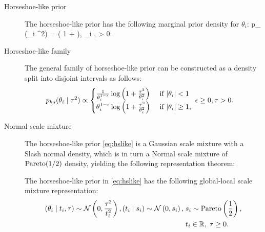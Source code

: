 \documentclass[11pt]{article}
\numberwithin{equation}{section}
\begin{document}
\begin{description}
\item [Horseshoe-like prior] The horseshoe-like prior \citet{bhadra2017horseshoe} has the following marginal prior density for $\theta_i$: 
\beq
\tilde p_{} (\theta_i \mid \tau^2) = \log \left ( 1 +  \right ), \quad  \; \theta_i  \in {},\; \tau > 0. \label{eq:hslike}
\eeq
\item [Horseshoe-like family] The general family of horseshoe-like prior can be constructed as a density split into disjoint intervals as follows:
\begin{align}
p_{hs}(\theta_i \mid \tau^2)&  \propto \begin{cases} 
      \frac{1}{\theta_i^{1-\epsilon}}\log \left( 1 + \frac{\tau^2}{\theta_i^2} \right) & \text{ if } {\lvert\theta_i\rvert < 1} \\
      \theta_i^{1-\epsilon} \log \left( 1 + \frac{\tau^2}{\theta_i^2} \right) & \text{ if }{\lvert\theta_i\rvert \ge 1}, \\
      \end{cases} 
\; \epsilon \ge 0,\tau > 0. \label{eq:split} 
\end{align}
\item [Normal scale mixture] The horseshoe-like prior \eqref{eq:hslike} is a Gaussian scale mixture with a Slash normal density, which is in turn a Normal scale mixture of ${\rm Pareto}(1/2)$ density, yielding the following representation theorem: 
\begin{theorem}\label{th:hslike}
The horseshoe-like prior in \eqref{eq:hslike} has the following global-local scale mixture representation:
\begin{align}
(\theta_i \mid t_i, \tau) \sim {\cal N}\left(0, \frac{\tau^2}{t_i^2} \right), (t_i \mid s_i)  \sim {\cal N}\left(0, s_i \right), \; & s_i \sim \mathrm{Pareto}\left( \frac{1}{2} \right), \label{eq:pareto}\\ 
& t_i \in \mathbb{R}, \; \tau \ge 0. \nonumber
\end{align}
\end{theorem}
\end{description}
\end{document}
